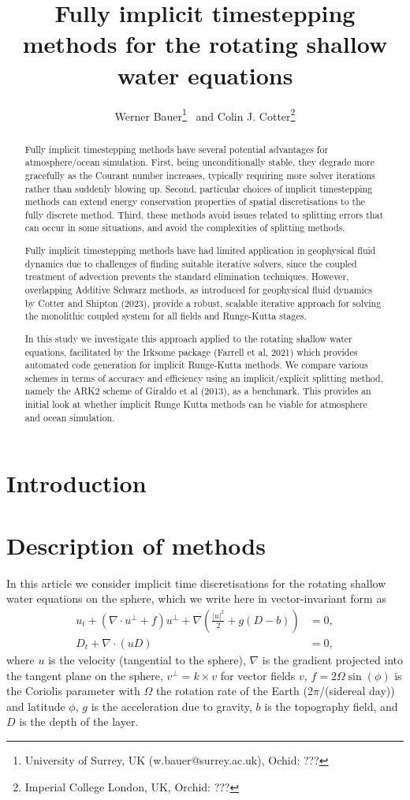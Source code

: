 \documentclass[a4paper]{article}
\title{Fully implicit timestepping methods for the rotating shallow water equations}
\author{Werner Bauer\footnote{University of Surrey, UK (w.bauer@surrey.ac.uk), Ochid: ???} \ and
Colin J. Cotter\footnote{Imperial College London, UK, Orchid: ???}  }
\begin{document}
\maketitle

\begin{abstract}
Fully implicit timestepping methods have several potential advantages for atmosphere/ocean simulation. First, being unconditionally stable, they degrade more gracefully as the Courant number increases, typically requiring more solver iterations rather than suddenly blowing up. Second, particular choices of implicit timestepping methods can extend energy conservation properties of spatial discretisations to the fully discrete method. Third, these methods avoid issues related to splitting errors that can occur in some situations, and avoid the complexities of splitting methods.

Fully implicit timestepping methods have had limited application in geophysical fluid dynamics due to challenges of finding suitable iterative solvers, since the coupled treatment of advection prevents the standard elimination techniques. However, overlapping Additive Schwarz methods, as introduced for geophysical fluid dynamics by Cotter and Shipton (2023), provide a robust, scalable iterative approach for solving the monolithic coupled system for all fields and Runge-Kutta stages.

In this study we investigate this approach applied to the rotating shallow water equations, facilitated by the Irksome package (Farrell et al, 2021) which provides automated code generation for implicit Runge-Kutta methods. We compare various schemes in terms of accuracy and efficiency using an implicit/explicit splitting method, namely the ARK2 scheme of Giraldo et al (2013), as a benchmark. This provides an initial look at whether implicit Runge Kutta methods can be viable for atmosphere and ocean simulation.
\end{abstract}

\section{Introduction}


\section{Description of methods}

In this article we consider implicit time discretisations for the
rotating shallow water equations on the sphere, which we write
here in vector-invariant form as
\begin{align}
  u_t + \left(\nabla\cdot u^\perp + f\right)u^\perp
  + \nabla\left(\frac{|u|^2}{2} + g(D-b)\right) & = 0, \\
  D_t + \nabla\cdot(uD) & = 0,
\end{align}
where $u$ is the velocity (tangential to the sphere), $\nabla$ is the
gradient projected into the tangent plane on the sphere, $v^\perp =
k\times v$ for vector fields $v$, $f=2\Omega \sin(\phi)$ is the
Coriolis parameter with $\Omega$ the rotation rate of the Earth
(2$\pi$/(sidereal day)) and latitude $\phi$, $g$ is the acceleration due to gravity,
$b$ is the topography field, and $D$ is the depth of the layer.
\end{document}
